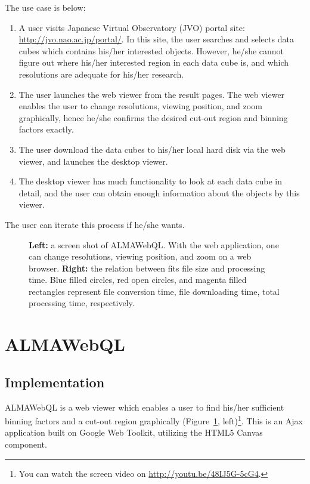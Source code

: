 The use case is below:
\begin{enumerate}
	\item A user visits Japanese Virtual Observatory (JVO) portal site:
	\url{http://jvo.nao.ac.jp/portal/}.
	In this site, the user searches and selects data cubes which
	contains his/her interested objects.
	However, he/she cannot figure out where his/her interested region
	in each data cube is, and which resolutions are adequate for his/her
	research.
	
	\item The user launches the web viewer from the result pages.
	The web viewer enables the user to change resolutions, viewing position, and
	zoom graphically, hence he/she confirms the desired cut-out region and binning
	factors exactly.
	
	\item The user download the data cubes to his/her local hard disk via the
	web viewer, and launches the desktop viewer.
	
	\item The desktop viewer has much functionality to look at each data cube in detail,
	and the user can obtain enough information about the objects by this viewer.
\end{enumerate}
The user can iterate this process if he/she wants.


\begin{figure}
	\caption{{\bf Left:} a screen shot of ALMAWebQL. With the web application, one can change resolutions,
	viewing position, and zoom on a web browser.
	{\bf Right:} the relation between fits file size and processing time. Blue filled circles, red
	open circles, and magenta filled rectangles represent file conversion time, file downloading time,
	total processing time, respectively.\label{O10_f2}}
\end{figure}


\section{ALMAWebQL}


\subsection{Implementation}

ALMAWebQL is a web viewer which enables a user to find his/her sufficient binning
factors and a cut-out region graphically (Figure~\ref{O10_f2}, left)\footnote{
You can watch the screen video on \url{http://youtu.be/48IJ5G-5cG4}.}.
This is an Ajax application built on Google Web Toolkit, utilizing the HTML5 Canvas component.

